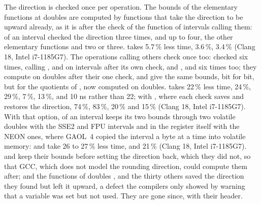 \documentclass[12pt,a4paper,twoside,openright]{book}
\begin{document}
\medskip
The direction is checked once per operation.\newinvfive{} The bounds of the
elementary functions at doubles are computed by functions that take the
direction to be upward already, as it is after the check of the function of
intervals calling them:  of an interval checked the direction
three times,  and  up to four, the other elementary
functions and  two or three.  takes 5.7\,\% less
time,  3.6\,\%,  3.4\,\% (Clang 18, Intel
i7-1185G7). The operations calling others check once too: 
checked six times, calling , \code{+} and \code{/} on
intervals after its own check, and , 
and  six times too; they compute on doubles after their one
check, and give the same bounds, bit for bit, but for the quotients of
, now computed on doubles.  takes 22\,\%
less time,  24\,\%,  29\,\%,
 7\,\%,  13\,\%, and
 10 ns rather than 22; with
, where each check saves and restores the
direction,  74\,\%,  83\,\%,
 20\,\% and  15\,\% (Clang 18,
Intel i7-1185G7). With that option,  of an interval
keeps its two bounds through two volatile doubles with the SSE2 and FPU
intervals and in the register itself with the NEON ones, where GAOL~4 copied
the interval a byte at a time into volatile memory:  and
 take 26 to 27\,\% less time,  and
 21\,\% (Clang 18, Intel i7-1185G7).  and
 keep their bounds before setting the direction back, which
they did not, so that GCC, which does not model the rounding direction,
could compute them after; and the functions of doubles ,
 and the thirty others saved the direction they found but
left it upward, a defect the compilers only showed by warning that a variable
was set but not used. They are gone since, with their header.
\end{document}
